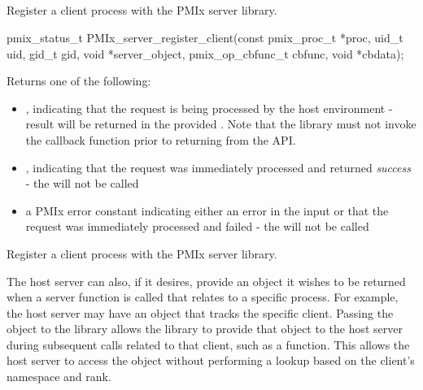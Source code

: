 \subsection{}

\summary

Register a client process with the PMIx server library.

\format

\cspecificstart
\begin{codepar}
pmix_status_t
PMIx_server_register_client(const pmix_proc_t *proc,
                        uid_t uid, gid_t gid,
                        void *server_object,
                        pmix_op_cbfunc_t cbfunc, void *cbdata);
\end{codepar}
\cspecificend

\begin{arglist}
\end{arglist}

Returns one of the following:

\begin{itemize}
    \item {}, indicating that the request is being processed by the host environment - result will be returned in the provided . Note that the library must not invoke the callback function prior to returning from the \ac{API}.
    \item {}, indicating that the request was immediately processed and returned \textit{success} - the  will not be called
    \item a PMIx error constant indicating either an error in the input or that the request was immediately processed and failed - the  will not be called
\end{itemize}

\descr

Register a client process with the PMIx server library.

The host server can also, if it desires, provide an object it wishes to be returned when a server function is called that relates to a specific process.
For example, the host server may have an object that tracks the specific client.
Passing the object to the library allows the library to provide that object to the host server during subsequent calls related to that client, such as a  function.  This allows the host server to access the object without performing a lookup based on the client's namespace and rank.

